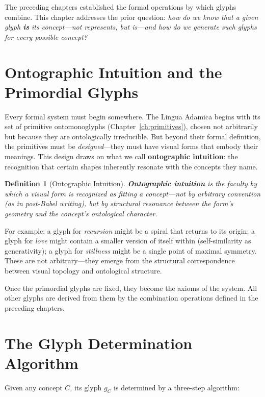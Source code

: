 \documentclass[12pt, letterpaper]{book}
\def\mathfrak#1{#1}%
\newtheorem{definition}{Definition}[chapter]
\begin{document}
The preceding chapters established the formal operations by which glyphs combine. This chapter addresses the prior question: \textit{how do we know that a given glyph \textbf{is} its concept---not represents, but is---and how do we generate such glyphs for every possible concept?}

\section{Ontographic Intuition and the Primordial Glyphs}

Every formal system must begin somewhere. The Lingua Adamica begins with its set of primitive ontomonoglyphs (Chapter~\ref{ch:primitives}), chosen not arbitrarily but because they are ontologically irreducible. But beyond their formal definition, the primitives must be \textit{designed}---they must have visual forms that embody their meanings. This design draws on what we call \textbf{ontographic intuition}: the recognition that certain shapes inherently resonate with the concepts they name.

\begin{definition}[Ontographic Intuition]\label{def:ontographic}
\textbf{Ontographic intuition} is the faculty by which a visual form is recognized as \textit{fitting} a concept---not by arbitrary convention (as in post-Babel writing), but by structural resonance between the form's geometry and the concept's ontological character.
\end{definition}

For example: a glyph for \textit{recursion} might be a spiral that returns to its origin; a glyph for \textit{love} might contain a smaller version of itself within (self-similarity as generativity); a glyph for \textit{stillness} might be a single point of maximal symmetry. These are not arbitrary---they emerge from the structural correspondence between visual topology and ontological structure.

Once the primordial glyphs are fixed, they become the axioms of the system. All other glyphs are derived from them by the combination operations defined in the preceding chapters.

\section{The Glyph Determination Algorithm}

Given any concept $C$, its glyph $\mathfrak{g}_C$ is determined by a three-step algorithm:
\end{document}
